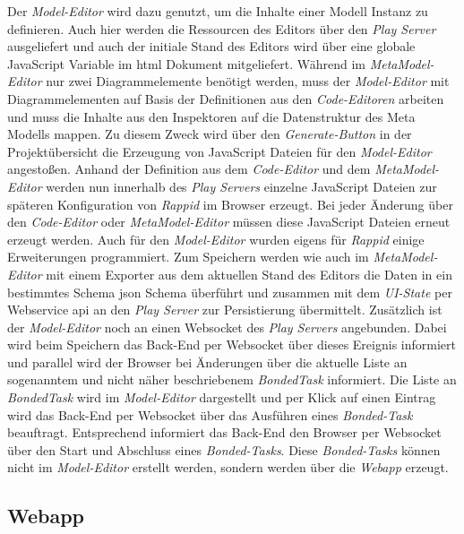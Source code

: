 Der \textit{Model-Editor} wird dazu genutzt, um die Inhalte einer Modell Instanz zu definieren. Auch hier werden die Ressourcen des Editors über den \textit{Play Server} ausgeliefert und auch der initiale Stand des Editors wird über eine globale JavaScript Variable im \ac{html} Dokument mitgeliefert. Während im \textit{MetaModel-Editor} nur zwei Diagrammelemente benötigt werden, muss der \textit{Model-Editor} mit Diagrammelementen auf Basis der Definitionen aus den \textit{Code-Editoren} arbeiten und muss die Inhalte aus den Inspektoren auf die Datenstruktur des Meta Modells mappen. Zu diesem Zweck wird über den \textit{Generate-Button} in der Projektübersicht die Erzeugung von JavaScript Dateien für den \textit{Model-Editor} angestoßen. Anhand der Definition aus dem \textit{Code-Editor} und dem \textit{MetaModel-Editor} werden nun innerhalb des \textit{Play Servers} einzelne JavaScript Dateien zur späteren Konfiguration von \textit{Rappid} im Browser erzeugt. Bei jeder Änderung über den \textit{Code-Editor} oder \textit{MetaModel-Editor} müssen diese JavaScript Dateien erneut erzeugt werden. Auch für den \textit{Model-Editor} wurden eigens für \textit{Rappid} einige Erweiterungen programmiert. Zum Speichern werden wie auch im \textit{MetaModel-Editor} mit einem Exporter aus dem aktuellen Stand des Editors die Daten in ein bestimmtes Schema \ac{json} Schema überführt und zusammen mit dem \textit{UI-State} per Webservice \ac{api} an den \textit{Play Server} zur Persistierung übermittelt. Zusätzlich ist der \textit{Model-Editor} noch an einen Websocket des \textit{Play Servers} angebunden. Dabei wird beim Speichern das Back-End per Websocket über dieses Ereignis informiert und parallel wird der Browser bei Änderungen über die aktuelle Liste an sogenanntem und nicht näher beschriebenem \textit{BondedTask} informiert. Die Liste an \textit{BondedTask} wird im \textit{Model-Editor} dargestellt und per Klick auf einen Eintrag wird das Back-End per Websocket über das Ausführen eines \textit{Bonded-Task} beauftragt. Entsprechend informiert das Back-End den Browser per Websocket über den Start und Abschluss eines \textit{Bonded-Tasks}. Diese \textit{Bonded-Tasks} können nicht im \textit{Model-Editor} erstellt werden, sondern werden über die \textit{Webapp} erzeugt.

\subsection{Webapp}

